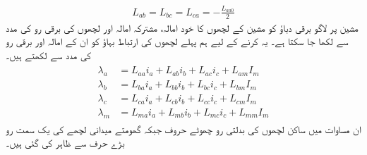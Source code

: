 \begin{align}\label{مساوات_معاصر_ساکن_مشترکہ_امالہ}
L_{ab}=L_{bc}=L_{ca}=-\frac{L_{aa0}}{2}
\end{align}
%
مشین پر لاگو برقی دباؤ کو مشین کے لچھوں کا خود امالہ، مشترکہ امالہ اور لچھوں کی  برقی رو کی مدد سے لکھا جا سکتا ہے۔ یہ کرنے کے لیے ہم پہلے  لچھوں کی ارتباط بہاؤ  کو ان کے امالہ اور برقی رو کی مدد سے لکھتے ہیں۔
\begin{gather}
\begin{aligned}\label{مساوات_معاصر_ارتباط_چار}
\lambda_a&=L_{aa} i_a+L_{ab} i_b +L_{ac} i_c+L_{am} I_m\\
\lambda_b&=L_{ba} i_a+L_{bb} i_b +L_{bc} i_c+L_{bm} I_m\\
\lambda_c&=L_{ca} i_a+L_{cb} i_b +L_{cc} i_c+L_{cm} I_m\\
\lambda_m&=L_{ma} i_a+L_{mb} i_b +L_{mc} i_c+L_{mm} I_m
\end{aligned}
\end{gather}
ان مساوات میں ساکن لچھوں کی  بدلتی  رو  چھوٹے حروف   جبکہ گھومتے میدانی لچھے کی  یک سمت   رو  بڑے حرف   سے ظاہر کی  گئی ہیں۔

